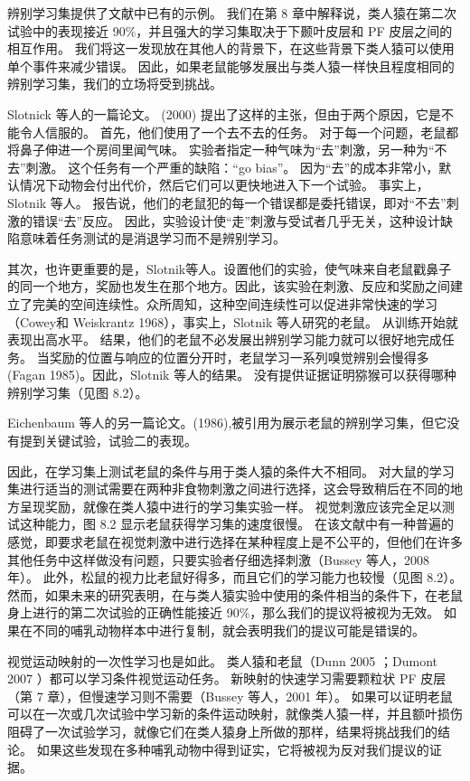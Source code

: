 \par 
辨别学习集提供了文献中已有的示例。 我们在第 8 章中解释说，类人猿在第二次试验中的表现接近 90$\%$，并且强大的学习集取决于下颞叶皮层和 PF 皮层之间的相互作用。 我们将这一发现放在其他人的背景下，在这些背景下类人猿可以使用单个事件来减少错误。 因此，如果老鼠能够发展出与类人猿一样快且程度相同的辨别学习集，我们的立场将受到挑战。
\par 
Slotnick 等人的一篇论文。 (2000) 提出了这样的主张，但由于两个原因，它是不能令人信服的。 首先，他们使用了一个去不去的任务。 对于每一个问题，老鼠都将鼻子伸进一个房间里闻气味。 实验者指定一种气味为“去”刺激，另一种为“不去”刺激。 这个任务有一个严重的缺陷：“go bias”。 因为“去”的成本非常小，默认情况下动物会付出代价，然后它们可以更快地进入下一个试验。 事实上，Slotnik 等人。 报告说，他们的老鼠犯的每一个错误都是委托错误，即对“不去”刺激的错误“去”反应。 因此，实验设计使“走”刺激与受试者几乎无关，这种设计缺陷意味着任务测试的是消退学习而不是辨别学习。
\par 
其次，也许更重要的是，Slotnik等人。设置他们的实验，使气味来自老鼠戳鼻子的同一个地方，奖励也发生在那个地方。因此，该实验在刺激、反应和奖励之间建立了完美的空间连续性。众所周知，这种空间连续性可以促进非常快速的学习（Cowey和 Weiskrantz 1968），事实上，Slotnik 等人研究的老鼠。 从训练开始就表现出高水平。 结果，他们的老鼠不必发展出辨别学习能力就可以很好地完成任务。 当奖励的位置与响应的位置分开时，老鼠学习一系列嗅觉辨别会慢得多 (Fagan 1985)。因此，Slotnik 等人的结果。 没有提供证据证明猕猴可以获得哪种辨别学习集（见图 8.2）。
\par 
Eichenbaum 等人的另一篇论文。(1986),被引用为展示老鼠的辨别学习集，但它没有提到关键试验，试验二的表现。
\par 
因此，在学习集上测试老鼠的条件与用于类人猿的条件大不相同。 对大鼠的学习集进行适当的测试需要在两种非食物刺激之间进行选择，这会导致稍后在不同的地方呈现奖励，就像在类人猿中进行的学习集实验一样。 视觉刺激应该完全足以测试这种能力，图 8.2 显示老鼠获得学习集的速度很慢。 在该文献中有一种普遍的感觉，即要求老鼠在视觉刺激中进行选择在某种程度上是不公平的，但他们在许多其他任务中这样做没有问题，只要实验者仔细选择刺激（Bussey 等人，2008 年）。 此外，松鼠的视力比老鼠好得多，而且它们的学习能力也较慢（见图 8.2）。然而，如果未来的研究表明，在与类人猿实验中使用的条件相当的条件下，在老鼠身上进行的第二次试验的正确性能接近 90$\%$，那么我们的提议将被视为无效。 如果在不同的哺乳动物样本中进行复制，就会表明我们的提议可能是错误的。
\par 
视觉运动映射的一次性学习也是如此。 类人猿和老鼠（Dunn  2005 ；Dumont 2007 ）都可以学习条件视觉运动任务。 新映射的快速学习需要颗粒状 PF 皮层（第 7 章），但慢速学习则不需要（Bussey 等人，2001 年）。 如果可以证明老鼠可以在一次或几次试验中学习新的条件运动映射，就像类人猿一样，并且额叶损伤阻碍了一次试验学习，就像它们在类人猿身上所做的那样，结果将挑战我们的结论。 如果这些发现在多种哺乳动物中得到证实，它将被视为反对我们提议的证据。
